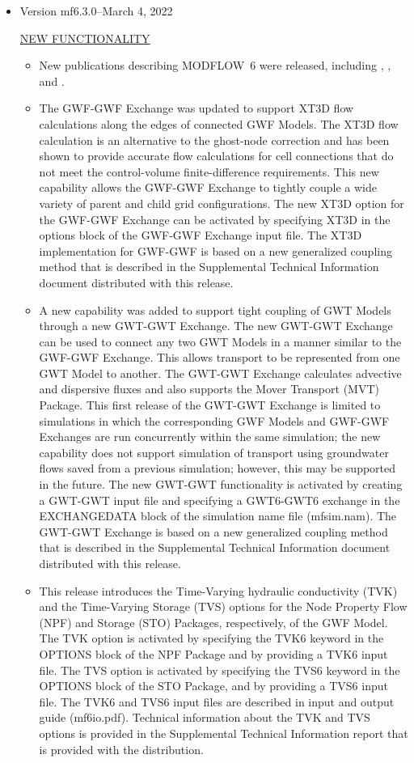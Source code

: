 \documentclass[11pt,twoside,twocolumn]{usgsreport}
\begin{document}
\begin{itemize}
	\item Version mf6.3.0--March 4, 2022
	
	\underline{NEW FUNCTIONALITY}
	\begin{itemize}
		\item New publications describing MODFLOW~6 were released, including \cite{modflow6api}, \cite{modflow6gwt}, and \cite{modflow6csub}. 
	        \item The GWF-GWF Exchange was updated to support XT3D flow calculations along the edges of connected GWF Models.  The XT3D flow calculation is an alternative to the ghost-node correction and has been shown to provide accurate flow calculations for cell connections that do not meet the control-volume finite-difference requirements.  This new capability allows the GWF-GWF Exchange to tightly couple a wide variety of parent and child grid configurations.  The new XT3D option for the GWF-GWF Exchange can be activated by specifying XT3D in the options block of the GWF-GWF Exchange input file.  The XT3D implementation for GWF-GWF is based on a new generalized coupling method that is described in the Supplemental Technical Information document distributed with this release.
	        \item A new capability was added to support tight coupling of GWT Models through a new GWT-GWT Exchange.  The new GWT-GWT Exchange can be used to connect any two GWT Models in a manner similar to the GWF-GWF Exchange.  This allows transport to be represented from one GWT Model to another.  The GWT-GWT Exchange calculates advective and dispersive fluxes and also supports the Mover Transport (MVT) Package.  This first release of the GWT-GWT Exchange is limited to simulations in which the corresponding GWF Models and GWF-GWF Exchanges are run concurrently within the same simulation; the new capability does not support simulation of transport using groundwater flows saved from a previous simulation; however, this may be supported in the future.  The new GWT-GWT functionality is activated by creating a GWT-GWT input file and specifying a GWT6-GWT6 exchange in the EXCHANGEDATA block of the simulation name file (mfsim.nam).  The GWT-GWT Exchange is based on a new generalized coupling method that is described in the Supplemental Technical Information document distributed with this release.
	        \item This release introduces the Time-Varying hydraulic conductivity (TVK) and the Time-Varying Storage (TVS) options for the Node Property Flow (NPF) and Storage (STO) Packages, respectively, of the GWF Model.  The TVK option is activated by specifying the TVK6 keyword in the OPTIONS block of the NPF Package and by providing a TVK6 input file.  The TVS option is activated by specifying the TVS6 keyword in the OPTIONS block of the STO Package, and by providing a TVS6 input file.  The TVK6 and TVS6 input files are described in input and output guide (mf6io.pdf).  Technical information about the TVK and TVS options is provided in the Supplemental Technical Information report that is provided with the distribution.

\end{itemize}
\end{itemize}
\end{document}

